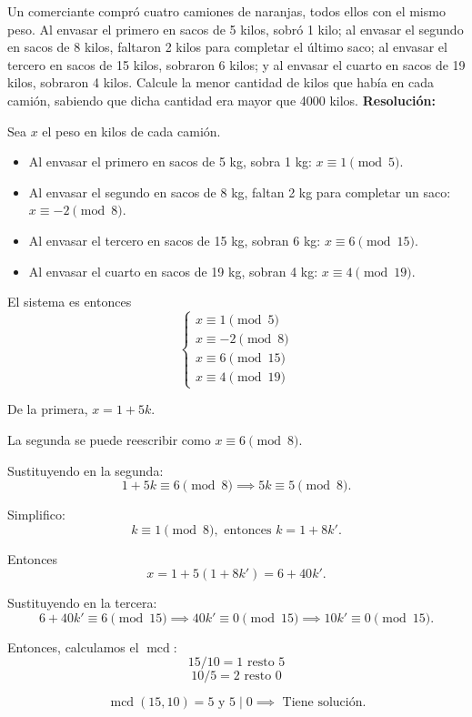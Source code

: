\documentclass[a4paper,12pt]{article}
\begin{document}
\begin{ejercicio}[title=Ejercicio 40]
Un comerciante compró cuatro camiones de naranjas, todos ellos con el mismo peso.
Al envasar el primero en sacos de 5 kilos, sobró 1 kilo; al envasar el segundo en sacos de 8 kilos, faltaron 2 kilos para completar el último saco;
al envasar el tercero en sacos de 15 kilos, sobraron 6 kilos; y al envasar el cuarto en sacos de 19 kilos, sobraron 4 kilos.
Calcule la menor cantidad de kilos que había en cada camión, sabiendo que dicha cantidad era mayor que 4000 kilos.
\tcblower
\textbf{Resolución:}

Sea \(x\) el peso en kilos de cada camión.  
\begin{itemize}
    \item Al envasar el primero en sacos de 5 kg, sobra 1 kg: \(x \equiv 1 \pmod{5}\).  
    \item Al envasar el segundo en sacos de 8 kg, faltan 2 kg para completar un saco: \(x \equiv -2 \pmod{8}\).  
    \item Al envasar el tercero en sacos de 15 kg, sobran 6 kg: \(x \equiv 6 \pmod{15}\).  
    \item Al envasar el cuarto en sacos de 19 kg, sobran 4 kg: \(x \equiv 4 \pmod{19}\).  
\end{itemize}

El sistema es entonces
\[
\begin{cases}
x \equiv 1 \pmod{5} \\
x \equiv -2 \pmod{8} \\
x \equiv 6 \pmod{15} \\
x \equiv 4 \pmod{19}
\end{cases}
\]

De la primera, \(x = 1+5k\).

La segunda se puede reescribir como \(x \equiv 6 \pmod{8}\).

Sustituyendo en la segunda:
\[
1+5k \equiv 6 \pmod{8} \implies 5k \equiv 5 \pmod{8}.
\]

Simplifico:
\[
k \equiv 1 \pmod{8}, \text{ entonces } k = 1 + 8k'.
\]

Entonces
\[
x = 1+5(1+8k') = 6+40k'.
\]

Sustituyendo en la tercera:
\[
6+40k' \equiv 6 \pmod{15} \implies 40k' \equiv 0 \pmod{15} \implies 10k' \equiv 0 \pmod{15}.
\]

Entonces, calculamos el \(\operatorname{mcd}\):
\[
15/10 = 1 \text{ resto } \boxed{5}
\]
\[
10/5 = 2 \text{ resto } 0
\]

\[
\operatorname{mcd}(15,10) = \boxed{5} \text{ y } 5 \mid 0 \implies \text{ Tiene solución.}
\]

\end{ejercicio}
\end{document}
